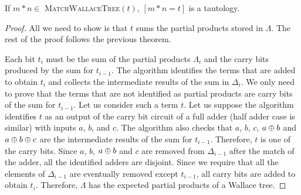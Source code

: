 \begin{thm}
  If $m*n\in$ \textsc{MatchWallaceTree}$(t)$, $[m*n = t]$ is a tautology.
\end{thm}
\begin{proof}
  All we need to show is that $t$ sums the partial products stored in
  $\Lambda$.
  The rest of the proof follows the previous theorem.

  Each bit $t_i$ must be the sum of the partial products $\Lambda_i$ and 
  the carry bits produced by the sum for $t_{i-1}$.
  The algorithm identifies the terms that are added to obtain $t_i$
  and collects the intermediate results of the sum in $\Delta_{i}$.
  We only need to prove that the terms that are not identified as
  partial products are carry bits of the sum for $t_{i-1}$.
  Let us consider such a term $t$.
  Let us suppose the algorithm identifies $t$ as an output of the carry
  bit circuit of a full adder (half adder case is similar) with inputs
  $a$, $b$, and $c$.
  The algorithm also checks that $a$, $b$, $c$, $a \oplus b$ and
  $a \oplus b \oplus c$ are the intermediate
  results of the sum for $t_{i-1}$.
  Therefore, $t$ is one of the carry bits.
  Since $a$, $b$, $a \oplus b$ and $c$ are removed from $\Delta_{i-1}$
  after the match of the adder,
  all the identified adders are disjoint.
  Since we require that all the elements of $\Delta_{i-1}$  are eventually
  removed except $t_{i-1}$, all carry bits are added to obtain $t_i$.
  Therefore, $\Lambda$ has the expected partial products of a Wallace tree.
\end{proof}


